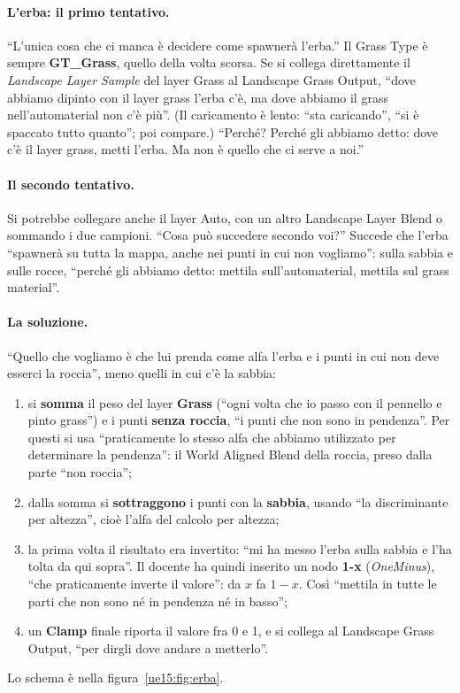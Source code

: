 \paragraph{L'erba: il primo tentativo.} ``L'unica cosa che ci manca è decidere come spawnerà
l'erba.'' Il Grass Type è sempre \textbf{GT\_Grass}, quello della volta scorsa. Se si
collega direttamente il \emph{Landscape Layer Sample} del layer Grass al Landscape Grass
Output, ``dove abbiamo dipinto con il layer grass l'erba c'è, ma dove abbiamo il grass
nell'automaterial non c'è più''. (Il caricamento è lento: ``sta caricando'', ``si è spaccato
tutto quanto''; poi compare.) ``Perché? Perché gli abbiamo detto: dove c'è il layer grass,
metti l'erba. Ma non è quello che ci serve a noi.''

\paragraph{Il secondo tentativo.} Si potrebbe collegare anche il layer Auto, con un altro
Landscape Layer Blend o sommando i due campioni. ``Cosa può succedere secondo voi?'' Succede
che l'erba ``spawnerà su tutta la mappa, anche nei punti in cui non vogliamo'': sulla sabbia
e sulle rocce, ``perché gli abbiamo detto: mettila sull'automaterial, mettila sul grass
material''.

\paragraph{La soluzione.} ``Quello che vogliamo è che lui prenda come alfa l'erba e i punti in
cui non deve esserci la roccia'', meno quelli in cui c'è la sabbia:
\begin{enumerate}
  \item si \textbf{somma} il peso del layer \textbf{Grass} (``ogni volta che io passo con il
        pennello e pinto grass'') e i punti \textbf{senza roccia}, ``i punti che non sono in
        pendenza''. Per questi si usa ``praticamente lo stesso alfa che abbiamo utilizzato per
        determinare la pendenza'': il World Aligned Blend della roccia, preso dalla parte
        ``non roccia'';
  \item dalla somma si \textbf{sottraggono} i punti con la \textbf{sabbia}, usando ``la
        discriminante per altezza'', cioè l'alfa del calcolo per altezza;
  \item la prima volta il risultato era invertito: ``mi ha messo l'erba sulla sabbia e l'ha
        tolta da qui sopra''. Il docente ha quindi inserito un nodo \textbf{1-x}
        (\emph{OneMinus}), ``che praticamente inverte il valore'': da $x$ fa $1-x$. Così
        ``mettila in tutte le parti che non sono né in pendenza né in basso'';
  \item un \textbf{Clamp} finale riporta il valore fra 0 e 1, e si collega al Landscape
        Grass Output, ``per dirgli dove andare a metterlo''.
\end{enumerate}
Lo schema è nella figura~\ref{ue15:fig:erba}.

